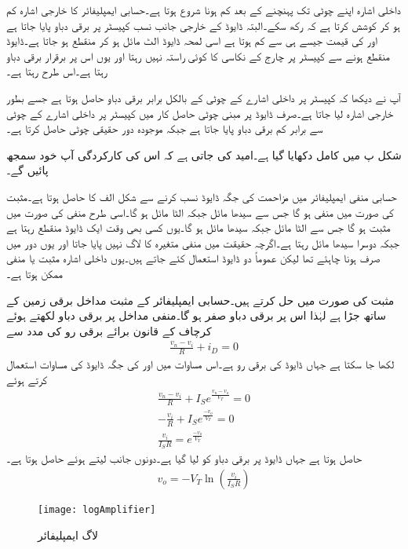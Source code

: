 داخلی اشارہ اپنے چوٹی تک پہنچنے کے بعد کم ہونا شروع ہوتا ہے۔حسابی ایمپلیفائر کا خارجی اشارہ  کم ہو کر کوشش کرتا ہے کہ  رکھ سکے۔البتہ ڈایوڈ کے خارجی جانب نسب کپیسٹر پر  برقی دباو پایا جاتا ہے اور  کی قیمت جیسے ہی  سے کم ہوتا ہے اسی لمحہ ڈایوڈ الٹ مائل ہو کر منقطع ہو جاتا ہے۔ڈایوڈ منقطع ہونے سے کپیسٹر پر چارج کے نکاسی  کا کوئی راستہ نہیں رہتا اور یوں اس پر برقرار  برقی دباو رہتا ہے۔اس طرح  رہتا ہے۔ 

آپ نے دیکھا کہ کپیسٹر پر داخلی اشارے کے چوٹی کے بالکل برابر برقی دباو حاصل ہوتا ہے جسے بطور خارجی اشارہ  لیا جاتا ہے۔صرف ڈایوڈ پر مبنی چوٹی حاصل کار میں کپیسٹر پر داخلی اشارے کے چوٹی سے  برابر کم برقی دباو پایا جاتا ہے جبکہ موجودہ دور حقیقی چوٹی حاصل کرتا ہے۔

شکل  پ میں کامل  دکھایا گیا ہے۔امید کی جاتی ہے کہ اس کی کارکردگی  آپ خود سمجھ پائیں گے۔

حسابی منفی ایمپلیفائر میں مزاحمت کی جگہ ڈایوڈ نسب کرنے سے شکل  الف کا  حاصل ہوتا ہے۔مثبت  کی صورت میں  منفی ہو گا جس سے  سیدھا مائل جبکہ  الٹا مائل ہو گا۔اسی طرح منفی   کی صورت میں  مثبت ہو گا جس سے  الٹا مائل جبکہ  سیدھا مائل ہو گا۔یوں کسی بھی وقت ایک ڈایوڈ منقطع رہتا ہے جبکہ دوسرا سیدھا مائل رہتا ہے۔اگرچہ حقیقت میں منفی متغیرہ کا لاگ نہیں پایا جاتا اور یوں دور میں صرف  ہونا چاہئے تھا لیکن عموماً دو ڈایوڈ استعمال کئے جاتے ہیں۔یوں داخلی اشارہ  مثبت یا منفی ممکن ہوتا ہے۔

مثبت  کی صورت میں حل کرتے ہیں۔حسابی ایمپلیفائر کے مثبت مداخل برقی زمین کے ساتھ جڑا ہے لہٰذا اس پر برقی دباو  صفر ہو گا۔منفی مداخل پر برقی دباو  لکھتے ہوئے کرچاف کے قانون برائے برقی رو کی مدد سے
\begin{align*}
\frac{v_n-v_i}{R}+i_D=0
\end{align*}
لکھا جا سکتا ہے جہاں  ڈایوڈ  کی برقی رو ہے۔اس مساوات میں   اور  کی جگہ ڈایوڈ کی مساوات استعمال کرتے ہوئے 
\begin{align*}
\frac{v_n-v_i}{R}+I_S e^{\frac{v_n-v_o}{V_T}}=0\\
-\frac{v_i}{R}+I_S e^{\frac{-v_o}{V_T}}=0\\
\frac{v_i}{I_S R}= e^{\frac{-v_o}{V_T}}
\end{align*}
حاصل ہوتا ہے جہاں ڈایوڈ پر برقی دباو کو  لیا گیا ہے۔دونوں جانب  لیتے ہوئے حاصل ہوتا ہے۔
\begin{align*}
v_o=-V_T \ln {\left( \frac{v_i}{I_S R} \right)}
\end{align*}
%
\begin{figure}
\centering
\texttt{[image: logAmplifier]}
\caption{لاگ ایمپلیفائر}
\label{شکل_ڈایوڈ_لاگ_ایمپلیفائر}
\end{figure}

